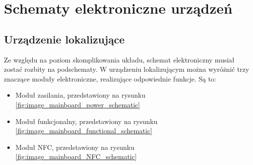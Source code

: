 \chapter{Schematy elektroniczne urządzeń}
\label{schematics}

\section{Urządzenie lokalizujące}
Ze względu na poziom skomplikowania układu, schemat elektroniczny musiał zostać rozbity na podschematy. W urządzeniu lokalizującym można wyróżnić trzy znaczące moduły elektroniczne, realizujące odpowiednie funkcje. Są to:

\begin{itemize}
\item Moduł zasilania, przedstawiony na rysunku \ref{fig:image_mainboard_power_schematic}
\item Moduł funkcjonalny, przedstawiony na rysunku \ref{fig:image_mainboard_functional_schematic}
\item Moduł NFC, przedstawiony na rysunku \ref{fig:image_mainboard_NFC_schematic}
\end{itemize}

